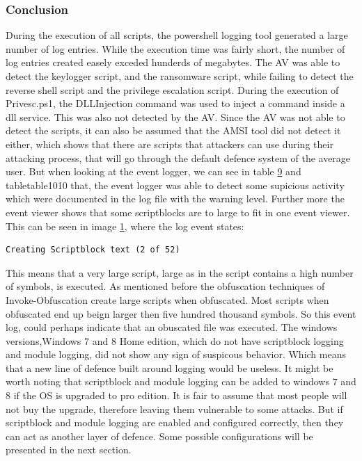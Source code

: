 \documentclass{article}%
\begin{document}
\subsubsection{Conclusion}
During the execution of all scripts, the powershell logging tool generated a large number of log entries. While the execution time was fairly short, the number of log entries created easely exceded hunderds of megabytes. The AV was able to detect the keylogger script, and the ransomware script, while failing to detect the reverse shell script and the privilege escalation script. During the execution of Privesc.ps1, the DLLInjection command was used to inject a command inside a dll service. This was also not detected by the AV. Since the AV was not able to detect the scripts, it can also be assumed that the AMSI tool did not detect it either, which shows that there are scripts that attackers can use during their attacking process, that will go through the default defence system of the average user. But when looking at the event logger, we can see in table \hyperlink{table9}{9} and table{table10}{10} that, the event logger was able to detect some supicious activity which were documented in the log file with the warning level. Further more the event viewer shows that some scriptblocks are to large to fit in one event viewer. This can be seen in image \hyperlink{fig1}{1}, where the log event states:
\begin{verbatim}
Creating Scriptblock text (2 of 52)
\end{verbatim}
This means that a very large script, large as in the script contains a high number of symbols, is executed. As mentioned before the obfuscation techniques of Invoke-Obfuscation create large scripts when obfuscated. Most scripts when obfuscated end up beign larger then five hundred thousand symbols. So this event log, could perhaps indicate that an obuscated file was executed. 
The windows versions,Windows $7$ and $8$ Home edition, which do not have scriptblock logging and module logging, did not show any sign of suspicous behavior. Which means that a new line of defence built around logging would be useless. It might be worth noting that scriptblock and module logging can be added to windows $7$ and $8$ if the OS is upgraded to pro edition. It is fair to assume that most people will not buy the upgrade, therefore leaving them vulnerable to some attacks. But if scriptblock and module logging are enabled and configured correctly, then they can act as another layer of defence. Some possible configurations will be presented in the next section.
\end{document}

